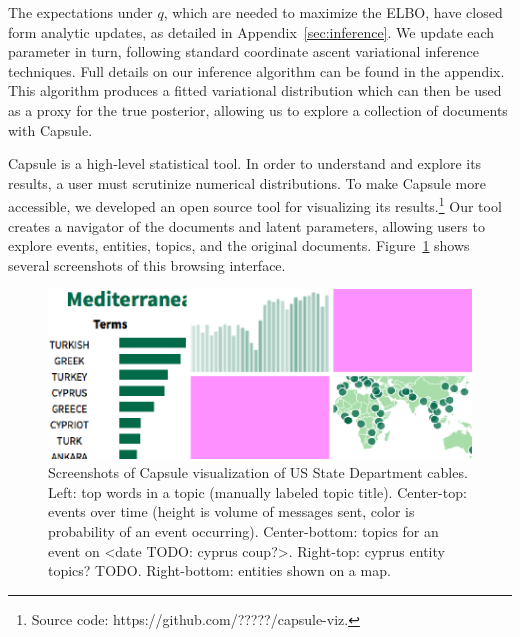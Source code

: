 The expectations under $q$, which are needed to maximize the ELBO, have closed form analytic updates, as detailed in Appendix~\ref{sec:inference}. We update each parameter in turn, following standard coordinate ascent variational inference techniques.  Full details on our inference algorithm can be found in the appendix.  This algorithm produces a fitted variational distribution which can then be used as a proxy for the true posterior, allowing us to explore a collection of documents with Capsule.  

Capsule is a high-level statistical tool. In order to understand and explore its results, a user must scrutinize numerical distributions.
To make Capsule more accessible, we developed an open source tool for visualizing its results.\footnote{Source code: https://github.com/?????/capsule-viz.}  Our tool creates a navigator of the documents and latent parameters, allowing users to explore events, entities, topics, and the original documents.  Figure~\ref{fig:viz} shows several screenshots of this browsing interface.

\begin{figure}
\centering
\includegraphics[width=\linewidth]{fig/viz.png}
\caption{Screenshots of Capsule visualization of US State Department cables.  Left: top words in a topic (manually labeled topic title).  Center-top: events over time (height is volume of messages sent, color is probability of an event occurring).  Center-bottom: topics for an event on <date TODO: cyprus coup?>.  Right-top: cyprus entity topics? TODO.  Right-bottom: entities shown on a map.}
\label{fig:viz}
\end{figure}
